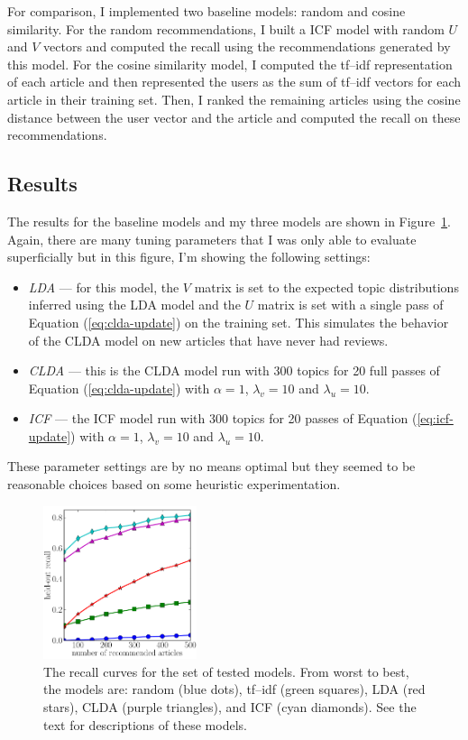 \documentclass[11pt]{article}
\newcommand{\eq}[1]{Equation (\ref{eq:#1})}
\newcommand{\fig}[1]{Figure~\ref{fig:#1}}
\newcommand{\figlabel}[1]{\label{fig:#1}}
\begin{document}
For comparison, I implemented two baseline models: random and cosine
similarity.
For the random recommendations, I built a ICF model with random $U$ and $V$
vectors and computed the recall using the recommendations generated by this
model.
For the cosine similarity model, I computed the tf--idf representation of each
article and then represented the users as the sum of tf--idf vectors for each
article in their training set.
Then, I ranked the remaining articles using the cosine distance between the
user vector and the article and computed the recall on these recommendations.

\subsection{Results}

The results for the baseline models and my three models are shown in
\fig{results}.
Again, there are many tuning parameters that I was only able to evaluate
superficially but in this figure, I'm showing the following settings:
\begin{itemize}
\item{\emph{LDA} --- for this model, the $V$ matrix is set to the expected
topic distributions inferred using the LDA model and the $U$ matrix is set
with a single pass of \eq{clda-update} on the training set.
This simulates the behavior of the CLDA model on new articles that have never
had reviews.}
\item{\emph{CLDA} --- this is the CLDA model run with 300 topics for 20 full
passes of \eq{clda-update} with $\alpha=1$, $\lambda_v=10$ and $\lambda_u=10$.}
\item{\emph{ICF} --- the ICF model run with 300 topics for 20 passes of
\eq{icf-update} with $\alpha=1$, $\lambda_v=10$ and $\lambda_u=10$.}
\end{itemize}
These parameter settings are by no means optimal but they seemed to be
reasonable choices based on some heuristic experimentation.

\begin{figure}
\centering
\includegraphics[width=0.4\textwidth]{results.pdf}
\caption{%
The recall curves for the set of tested models.
From worst to best, the models are: random (blue dots), tf--idf (green
squares), LDA (red stars), CLDA (purple triangles), and ICF (cyan diamonds).
See the text for descriptions of these models.
\figlabel{results}}
\end{figure}
\end{document}
